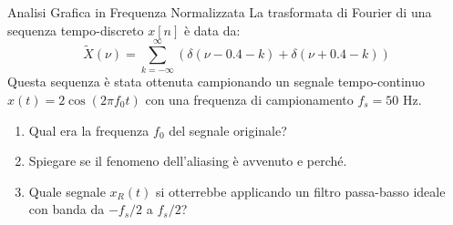 
\begin{esercizio}{Analisi Grafica in Frequenza Normalizzata}
    La trasformata di Fourier di una sequenza tempo-discreto $x[n]$ è data da:
    \[
        \tilde{X}(\nu) = \sum_{k=-\infty}^{\infty} \left( \delta(\nu - 0.4 - k) + \delta(\nu + 0.4 - k) \right)
    \]
    Questa sequenza è stata ottenuta campionando un segnale tempo-continuo $x(t) = 2\cos(2\pi f_0 t)$ con una frequenza di campionamento $f_s=50$ Hz.
    
    \begin{enumerate}
        \item Qual era la frequenza $f_0$ del segnale originale?
        \item Spiegare se il fenomeno dell'aliasing è avvenuto e perché.
        \item Quale segnale $x_R(t)$ si otterrebbe applicando un filtro passa-basso ideale con banda da $-f_s/2$ a $f_s/2$?
    \end{enumerate}
\end{esercizio}